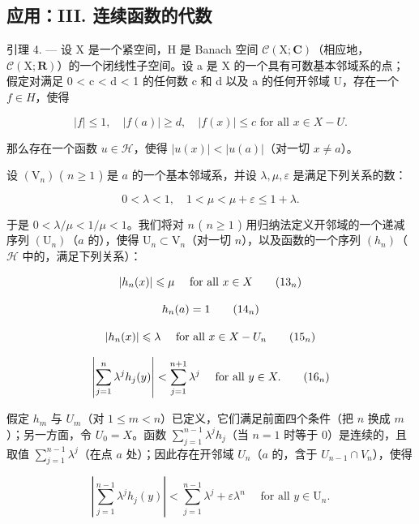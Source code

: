 \subsection{应用：III. 连续函数的代数}

引理 4. --- 设 X 是一个紧空间，H 是 Banach 空间 \(\mathcal{C}(\mathrm{X};\mathbf{C})\)（相应地，\(\mathcal{C}(\mathrm{X};\mathbf{R})\)）的一个闭线性子空间。设 a 是 X 的一个具有可数基本邻域系的点；假定对满足 0 < c < d < 1 的任何数 c 和 d 以及 a 的任何开邻域 U，存在一个 \(f \in H\)，使得

\[
| f | \leqslant 1, \quad | f (a) | \geqslant d, \quad | f (x) | \leqslant c \text {   for   all   } x \in X - U.\tag{12}
\]

那么存在一个函数 \(u \in \mathcal{H}\)，使得 \(|u(x)| < |u(a)|\)（对一切 \(x \neq a\)）。

设 \(\left(\mathrm{V}_{n}\right)\) ( \(n \geqslant 1\) ) 是 \(a\) 的一个基本邻域系，并设 \(\lambda, \mu, \varepsilon\) 是满足下列关系的数：

\[
0 <   \lambda <   1, \quad 1 <   \mu <   \mu + \varepsilon \leqslant 1 + \lambda .
\]

于是 \(0 < \lambda / \mu < 1 / \mu < 1\)。我们将对 \(n\) ( \(n \geqslant 1\) ) 用归纳法定义开邻域的一个递减序列 \((\mathrm{U}_n)\)（\(a\) 的），使得 \(\mathrm{U}_n \subset \mathrm{V}_n\)（对一切 \(n\)），以及函数的一个序列 \((h_n)\)（\(\mathcal{H}\) 中的，满足下列关系）：

\[
\left| h _ {n} (x) \right| \leqslant \mu \quad \text { for   all } x \in X\tag{\ensuremath{13_n}}
\]

\[
h _ {n} (a) = 1\tag{\ensuremath{14_n}}
\]

\[
\left| h _ {n} (x) \right| \leqslant \lambda \quad \text { for   all } x \in X - U _ {n}\tag{\ensuremath{15_n}}
\]

\[
\left| \sum_ {j = 1} ^ {n} \lambda^ {j} h _ {j} (y) \right| <   \sum_ {j = 1} ^ {n + 1} \lambda^ {j} \quad \text { for   all } y \in X.\tag{\ensuremath{16_n}}
\]

假定 \(h_m\) 与 \(U_m\)（对 \(1 \leqslant m < n\)）已定义，它们满足前面四个条件（把 \(n\) 换成 \(m\)）；另一方面，令 \(U_0 = X\)。函数 \(\sum_{j=1}^{n-1} \lambda^j h_j\)（当 \(n = 1\) 时等于 0）是连续的，且取值 \(\sum_{j=1}^{n-1} \lambda^j\)（在点 \(a\) 处）；因此存在开邻域 \(U_n\)（\(a\) 的，含于 \(U_{n-1} \cap V_n\)），使得

\[
\left| \sum_ {j = 1} ^ {n - 1} \lambda^ {j} h _ {j} (y) \right| <   \sum_ {j = 1} ^ {n - 1} \lambda^ {j} + \varepsilon \lambda^ {n} \quad \text { for   all } y \in \mathrm{U} _ {n}.\tag{17}
\]

